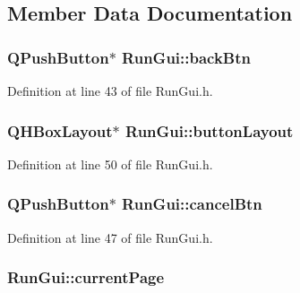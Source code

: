 \subsection{Member Data Documentation}
\hypertarget{class_run_gui_a5a79c5d8f3a61510c2be51738e428473}{
\subsubsection[{back\-Btn}]{\setlength{\rightskip}{0pt plus 5cm}Q\-Push\-Button$\ast$ Run\-Gui\-::back\-Btn\hspace{0.3cm}{\ttfamily [private]}}}\label{class_run_gui_a5a79c5d8f3a61510c2be51738e428473}


Definition at line 43 of file Run\-Gui.\-h.

\hypertarget{class_run_gui_a812f0836d9eb5b0148cf92b61bc53be2}{
\subsubsection[{button\-Layout}]{\setlength{\rightskip}{0pt plus 5cm}Q\-H\-Box\-Layout$\ast$ Run\-Gui\-::button\-Layout\hspace{0.3cm}{\ttfamily [private]}}}\label{class_run_gui_a812f0836d9eb5b0148cf92b61bc53be2}


Definition at line 50 of file Run\-Gui.\-h.

\hypertarget{class_run_gui_aa14d8877052e9cc11c93055561501792}{
\subsubsection[{cancel\-Btn}]{\setlength{\rightskip}{0pt plus 5cm}Q\-Push\-Button$\ast$ Run\-Gui\-::cancel\-Btn\hspace{0.3cm}{\ttfamily [private]}}}\label{class_run_gui_aa14d8877052e9cc11c93055561501792}


Definition at line 47 of file Run\-Gui.\-h.

\hypertarget{class_run_gui_a1d93e84df8a71767ca927554e5b0fe0d}{
\subsubsection[{current\-Page}]{ Run\-Gui\-::current\-Page\hspace{0.3cm}{\ttfamily [private]}}}\label{class_run_gui_a1d93e84df8a71767ca927554e5b0fe0d}


